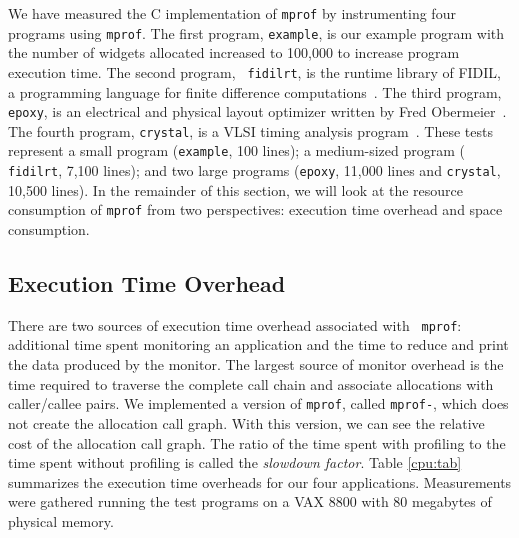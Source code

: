 We have measured the C implementation of {\tt mprof} by instrumenting
four programs using {\tt mprof}.  The first program, {\tt example}, is
our example program with the number of widgets allocated increased to
100,000 to increase program execution time.  The second program, {\tt
fidilrt}, is the runtime library of FIDIL, a programming language for
finite difference computations~\cite{hilfinger88:fidil}.  The third
program, {\tt epoxy}, is an electrical and physical layout optimizer
written by Fred Obermeier~\cite{fwo87:epoxy}.  The fourth program,
{\tt crystal}, is a VLSI timing analysis
program~\cite{ouster85:crystal}.  These tests represent a small
program ({\tt example}, 100 lines); a medium-sized program ({\tt
fidilrt}, 7,100 lines); and two large programs ({\tt epoxy}, 11,000
lines and {\tt crystal}, 10,500 lines).  In the remainder of this
section, we will look at the resource consumption of {\tt mprof} from
two perspectives: execution time overhead and space consumption.

\subsection{Execution Time Overhead}

There are two sources of execution time overhead associated with {\tt
mprof}: additional time spent monitoring an application and the time
to reduce and print the data produced by the monitor.  The largest
source of monitor overhead is the time required to traverse the
complete call chain and associate allocations with caller/callee
pairs.  We implemented a version of {\tt mprof}, called {\tt mprof-},
which does not create the allocation call graph.  With this version,
we can see the relative cost of the allocation call graph.  The ratio
of the time spent with profiling to the time spent without profiling
is called the {\em slowdown factor\/}.  Table \ref{cpu:tab} summarizes
the execution time overheads for our four applications.  Measurements
were gathered running the test programs on a VAX 8800 with 80
megabytes of physical memory.


